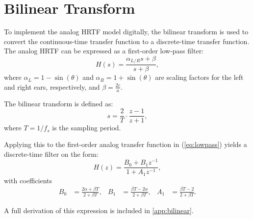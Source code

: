 \section{Bilinear Transform}

To implement the analog HRTF model digitally, the bilinear transform is used to convert the continuous-time transfer function to a discrete-time transfer function. The analog HRTF can be expressed as a first-order low-pass filter:
\begin{equation}
  H(s) = \frac{\alpha_{L/R} s + \beta}{s + \beta},
  \label{eq:lowpass}
\end{equation}
where \( \alpha_L = 1 - \sin(\theta) \) and \( \alpha_R = 1 + \sin(\theta) \) are scaling factors
for the left and right ears, respectively, and \( \beta = \frac{2c}{a} \).

The bilinear transform is defined as:
\begin{equation}
  s = \frac{2}{T} \cdot \frac{z-1}{z+1},
\end{equation}
where \( T = 1/f_s \) is the sampling period.

Applying this to the first-order analog transfer function in (\autoref{eq:lowpass}) yields a discrete-time filter on the form:
\begin{equation}
  H(z) = \frac{B_0 + B_1 z^{-1}}{1 + A_1 z^{-1}},
\end{equation}
with coefficients
\begin{align}
  B_0 &= \frac{2\alpha + \beta T}{2 + \beta T}, &
  B_1 &= \frac{\beta T - 2\alpha}{2 + \beta T}, &
  A_1 &= \frac{\beta T - 2}{2 + \beta T}.
\end{align}

A full derivation of this expression is included in \autoref{app:bilinear}.